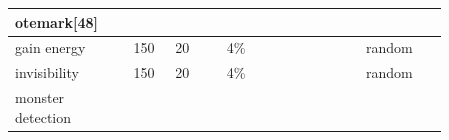 \begin{longtable}{|>{\RaggedRight}p{0.23462\linewidth}|>{\RaggedRight}p{0.08075\linewidth}|>{\RaggedRight}p{0.10890\linewidth}|>{\RaggedRight}p{0.27027\linewidth}|>{\RaggedRight}p{0.16262\linewidth}|}
otemark[48]\\ \hline \hspace*{0pt}\ignorespaces{}\hspace*{0pt}gain energy\footnotemark[49]&\hspace*{0pt}\ignorespaces{}\hspace*{0pt}150&\hspace*{0pt}\ignorespaces{}\hspace*{0pt}20&\hspace*{0pt}\ignorespaces{}\hspace*{0pt}4\%&\hspace*{0pt}\ignorespaces{}\hspace*{0pt}random\footnotemark[50]\\ \hline \hspace*{0pt}\ignorespaces{}\hspace*{0pt}invisibility\footnotemark[51]&\hspace*{0pt}\ignorespaces{}\hspace*{0pt}150&\hspace*{0pt}\ignorespaces{}\hspace*{0pt}20&\hspace*{0pt}\ignorespaces{}\hspace*{0pt}4\%&\hspace*{0pt}\ignorespaces{}\hspace*{0pt}random\footnotemark[52]\\ \hline \hspace*{0pt}\ignorespaces{}\hspace*{0pt}monster detection\footnotemark[53]&\
\end{longtable}
